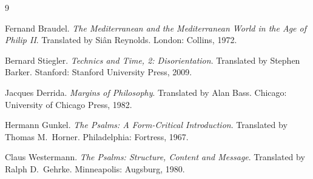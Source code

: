 \documentclass[12pt,a4paper]{article}
\begin{document}

\begin{thebibliography}{9}

Fernand Braudel.
\newblock \emph{The Mediterranean and the Mediterranean World in the Age of Philip II}.
\newblock Translated by Si\^{a}n Reynolds. London: Collins, 1972.

Bernard Stiegler.
\newblock \emph{Technics and Time, 2: Disorientation}.
\newblock Translated by Stephen Barker. Stanford: Stanford University Press, 2009.

Jacques Derrida.
\newblock \emph{Margins of Philosophy}.
\newblock Translated by Alan Bass. Chicago: University of Chicago Press, 1982.

Hermann Gunkel.
\newblock \emph{The Psalms: A Form-Critical Introduction}.
\newblock Translated by Thomas M.\ Horner. Philadelphia: Fortress, 1967.

Claus Westermann.
\newblock \emph{The Psalms: Structure, Content and Message}.
\newblock Translated by Ralph D.\ Gehrke. Minneapolis: Augsburg, 1980.

\end{thebibliography}
\end{document}
